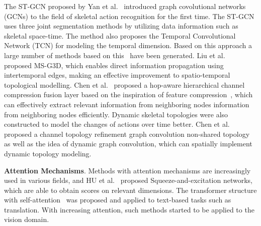 \documentclass[letterpaper]{article} \usepackage[submission]{aaai23}  \usepackage{times}  \usepackage{helvet}  \usepackage{courier}  \usepackage[hyphens]{url}  \usepackage{graphicx} \urlstyle{rm} \def\UrlFont{\rm}  \usepackage{natbib}  \usepackage{caption} \frenchspacing  \setlength{\pdfpagewidth}{8.5in} \setlength{\pdfpageheight}{11in} \usepackage{algorithm}
\begin{document}
The ST-GCN proposed by Yan et al.~\cite{DBLP:conf/aaai/YanXL18} introduced graph covolutional networks (GCNs) to the field of skeletal action recognition for the first time. The ST-GCN uses three joint segmentation methods by utilizing data information such as skeletal space-time. The method also proposes the Temporal Convolutional Network (TCN) for modeling the temporal dimension. Based on this approach a large number of methods based on this~\cite{DBLP:conf/aaai/YanXL18,2020Feedback,2019Symbiotic,2020Learning} have been generated. Liu et al.~\cite{2020Disentangling} proposed MS-G3D, which enables direct information propagation using intertemporal edges, making an effective improvement to spatio-temporal topological modelling. Chen et al.~\cite{2021Learning1} proposed a hop-aware hierarchical channel compression fusion layer based on the inspiration of feature compression~\cite{DBLP:conf/bmvc/ZouLWT20,2019AutoSlim,2021Hop}, which can effectively extract relevant information from neighboring nodes information from neighboring nodes efficiently. Dynamic skeletal topologies were also constructed to model the changes of actions over time better. Chen et al.~\cite{2021Channel} proposed a channel topology refinement graph convolution non-shared topology as well as the idea of dynamic graph convolution, which can spatially implement dynamic topology modeling.






{\bf Attention Mechanisms}. Methods with attention mechanisms are increasingly used in various fields, and HU et al.~\cite{2017Squeeze} proposed Squeeze-and-excitation networks, which are able to obtain scores on relevant dimensions. The transformer structure with self-attention~\cite{2017Attention} was proposed and applied to text-based tasks such as translation. With increasing attention, such methods started to be applied to the vision domain.
\end{document}
